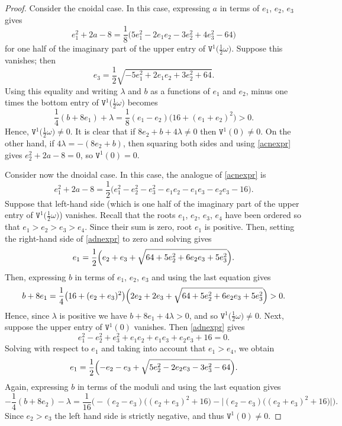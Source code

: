 \documentclass[10pt,a4paper]{amsart}
\newcommand\tV{\mathtt{V}}
\numberwithin{equation}{section}
\begin{document}
\begin{proof}
Consider the cnoidal case. In this case, expressing $a$ in terms of $e_1$, $e_2$, $e_3$ gives
\begin{equation}\label{acnexpr}
e_1^2+2a-8=\frac{1}{8}\bigl(5e_1^2-2e_1e_2-3e_2^2+4e_3^2-64\bigr)
\end{equation}
for one half of the imaginary part of the upper entry of $\tV^1\bigl(\tfrac12 \omega\bigr)$. Suppose this vanishes; then
\[e_3=\frac{1}{2}\sqrt{-5e_1^2+2e_1e_2+3e_2^2+64}.\]
Using this equality and writing $\lambda$ and $b$ as a functions of $e_1$ and $e_2$, minus one times the bottom entry of $\tV^1\bigl(\tfrac12 \omega\bigr)$ becomes
\[\frac{1}{4}(b+8e_1)+\lambda = \frac{1}{8}(e_1-e_2)\bigl(16+(e_1+e_2)^2\bigr)>0.\]
Hence, ${\mathtt V}^1\bigl(\tfrac12 \omega\bigr)\neq 0$.
It is clear that if $8e_2+b+4\lambda\neq 0$ then $\tV^1(0) \ne 0$. On the other hand, if $4\lambda = -(8e_2 + b)$, then
squaring both sides and using \eqref{acnexpr} gives $e_2^2+2a-8=0$, so $\tV^1(0)=0$.

Consider now the dnoidal case. In this case, the analogue of \eqref{acnexpr} is
\begin{equation}\label{adnexpr}
e_1^2+2a-8 = \frac12\bigl(e_1^2-e_2^2-e_3^2-e_1 e_2 - e_1 e_3 - e_2 e_3 -16\bigr).
\end{equation}
Suppose that left-hand side \big(which is one half of the imaginary part of the upper entry of $\tV^1\bigl(\tfrac12 \omega\bigr)$\big) vanishes.
Recall that the roots $e_1$, $e_2$, $e_3$, $e_4$ have been ordered so that $e_1>e_2>e_3>e_4$. Since their sum is zero, root $e_1$ is positive. Then, setting the right-hand side of \eqref{adnexpr} to
zero and solving gives
\[e_1=\frac{1}{2}\Bigl(e_2+e_3+\sqrt{64+5e_2^2+6e_2e_3+5e_3^2}\Bigr).\]
Then, expressing $b$ in terms of $e_1$, $e_2$, $e_3$ and using the last equation gives
\[b+8e_1=\frac{1}{4}\bigl(16+(e_2+e_3)^2\bigr)\Bigl(2e_2+2e_3+\sqrt{64+5e_2^2+6e_2e_3+5e_3^2}\Bigr)>0.\]
Hence, since $\lambda$ is positive we have $b+8e_1+4\lambda>0$, and so $\tV^1\bigl(\tfrac12 \omega\bigr) \ne 0$.
Next, suppose the upper entry of $\tV^1(0)$ vanishes. Then \eqref{adnexpr} gives
\[e_1^2-e_2^2+e_3^2+e_1e_2+e_1e_3+e_2e_3+16=0.\]
Solving with respect to $e_1$ and taking into account that $e_1>e_4$, we obtain
\[e_1=\frac{1}{2}\Bigl(-e_2-e_3+\sqrt{5e_2^2-2e_2e_3-3e_3^2-64}\Bigr).\]
Again, expressing $b$ in terms of the moduli and using the last equation gives
\[-\frac{1}{4}(b+8e_2)-\lambda=\frac{1}{16}\bigl(-(e_2-e_3)\bigl((e_2+e_3)^2+16\bigr)-\big|(e_2-e_3)\bigl((e_2+e_3)^2+16\bigr)\big|\bigr).\]
Since $e_2>e_3$ the left hand side is strictly negative, and thus $\tV^1(0)\ne0$.
\end{proof}
\end{document}
